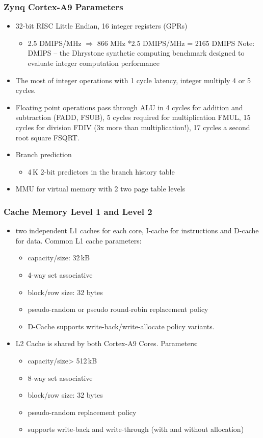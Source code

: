 \documentclass{beamer}
\begin{document}
\begin{frame}
\frametitle{Zynq Cortex-A9 Parameters}

\begin{itemize}
 \item 32-bit RISC Little Endian, 16 integer registers (GPRs)
 \begin{itemize}
  \item 2.5 DMIPS/MHz $\Rightarrow$ 866 MHz *2.5 DMIPS/MHz = 2165 DMIPS
  {\newline Note: DMIPS -- the Dhrystone synthetic computing benchmark designed to evaluate integer computation performance}
 \end{itemize}
 \item The most of integer operations with 1 cycle latency, integer multiply 4 or 5 cycles.
 \item Floating point operations pass through ALU in 4 cycles for addition and subtraction (FADD, FSUB), 5 cycles required for multiplication FMUL, 15 cycles for division FDIV (3x more than multiplication!), 17 cycles a second root square FSQRT.
 \item Branch prediction
 \begin{itemize}
  \item 4\,K 2-bit predictors in the branch history table
 \end{itemize}
 \item MMU for virtual memory with 2 two page table levels
\end{itemize}

\end{frame}

\begin{frame}
\frametitle{Cache Memory Level 1 and Level 2}
\begin{itemize}
 \item two independent L1 caches for each core, I-cache for instructions and D-cache for data. Common L1 cache parameters:
 \begin{itemize}
  \item capacity/size: 32\,kB
  \item 4-way set associative
  \item block/row size: 32 bytes
  \item pseudo-random or pseudo round-robin replacement policy
  \item D-Cache supports write-back/write-allocate policy variants.
 \end{itemize}
 \item L2 Cache is shared by both Cortex-A9 Cores. Parameters:
 \begin{itemize}
   \item capacity/size> 512\,kB
   \item 8-way set associative
   \item block/row size: 32 bytes
   \item pseudo-random replacement policy
   \item supports write-back and write-through (with and without allocation)
 \end{itemize}
\end{itemize}

\end{frame}
\end{document}
